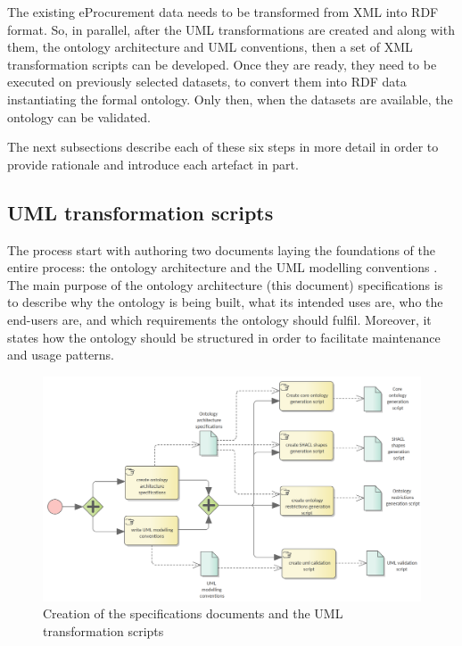 	
	The existing eProcurement data needs to be transformed from XML into RDF format. So, in parallel, after the UML transformations are created and along with them, the ontology architecture and UML conventions, then a set of XML transformation scripts can be developed. Once they are ready, they need to be executed on previously selected datasets, to convert them into RDF data instantiating the formal ontology. Only then, when the datasets are available, the ontology can be validated. 
	
	The next subsections describe each of these six steps in more detail in order to provide rationale and introduce each artefact in part.
	
	\subsection{UML transformation scripts}
	\label{sec:uml-transformation}
	
	The process start with authoring two documents laying the foundations of the entire process: the ontology architecture and the UML modelling conventions \citep{costetchi2020b}. The main purpose of the ontology architecture (this document) specifications is to describe why the ontology is being built, what its intended uses are, who the end-users are, and which requirements the ontology should fulfil. Moreover, it states how the ontology should be structured in order to facilitate maintenance and usage patterns.
	
	
	\begin{figure}[!ht]		
		\centering
		\includegraphics[width=\textwidth]{../img/uml2formalScriptCreation.png}
		\caption{Creation of the specifications documents and the UML transformation scripts}
		\label{fig:uml-transformation}
	\end{figure}
	
